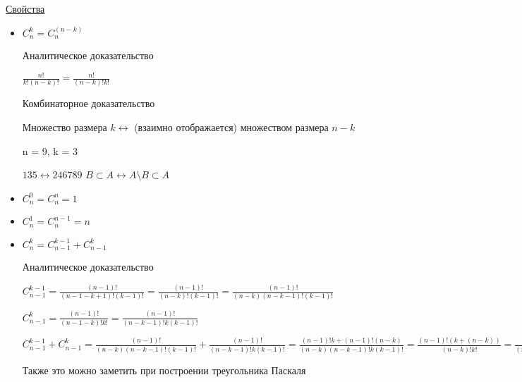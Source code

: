 \documentclass{article}
\begin{document}
\underline{Свойства}
\begin{itemize}
\item	$C_n^k= C_n^(n-k)$
	
Аналитическое доказательство 

$\frac {n!}{k!(n-k)!} = \frac{n!}{(n-k)!k!}$


Комбинаторное доказательство

Множество размера $k \leftrightarrow$ (взаимно отображается) множеством размера $n-k$

n = 9, k = 3

$135 \leftrightarrow 246789$
$B \subset A \leftrightarrow A \setminus B 	\subset A$    

\item	$C_n^0= C_n^n=1$
\item	$C_n^1= C_n^{n-1}=n$
\item	$C_n^k= C_{n-1}^{k-1}  + C_{n-1}^k$

Аналитическое доказательство

$C_{n-1}^{k-1} = \frac{(n-1)!}{(n-1-k+1)!(k-1)!} = \frac{(n-1)!}{(n-k)!(k-1)!} = \frac{(n-1)!}{(n-k)(n-k-1)!(k-1)!}$ 


$C_{n-1}^k = \frac{(n-1)!}{(n-1-k)!k!} = \frac{(n-1)!}{(n-k-1)!k(k-1)!} $

 $C_{n-1}^{k-1} + C_{n-1}^k = \frac{(n-1)!}{(n-k)(n-k-1)!(k-1)!} + \frac{(n-1)!}{(n-k-1)!k(k-1)!} = \frac{(n-1)!k+(n-1)!(n-k)}{(n-k)(n-k-1)!k(k-1)!} = \frac{(n-1)!(k+(n-k))}{(n-k)!k!} = \frac{n!}{(n-k)!k!} = C_n^k$ 

Также это можно заметить при построении треугольника Паскаля

\end{itemize}
\end{document}
